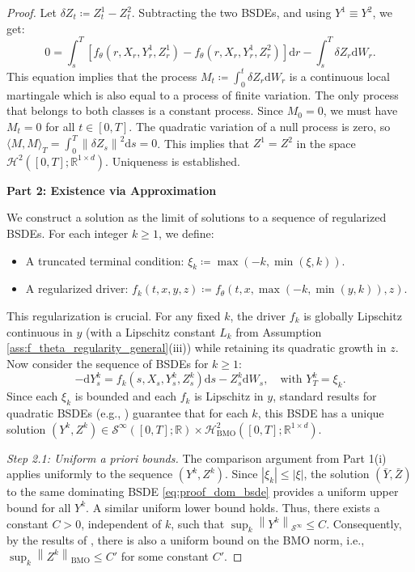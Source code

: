\documentclass[qian]{imsart}
\newcommand{\R}{\mathbb{R}}
\newcommand{\dd}{\mathrm{d}}
\newcommand{\norm}[1]{\left\lVert#1\right\rVert}
\newcommand{\abs}[1]{\left\lvert#1\right\rvert}
\theoremstyle{plain}
\theoremstyle{definition}
\begin{document}
\begin{proof}
Let $\delta Z_t \coloneqq Z^1_t - Z^2_t$. Subtracting the two BSDEs, and using $Y^1 \equiv Y^2$, we get:
\[ 0 = \int_s^T \left[ f_\theta(r, X_r, Y^1_r, Z^1_r) - f_\theta(r, X_r, Y^1_r, Z^2_r) \right] \dd r - \int_s^T \delta Z_r \dd W_r. \]
This equation implies that the process $M_t \coloneqq \int_0^t \delta Z_r \dd W_r$ is a continuous local martingale which is also equal to a process of finite variation. The only process that belongs to both classes is a constant process. Since $M_0 = 0$, we must have $M_t = 0$ for all $t \in [0,T]$. The quadratic variation of a null process is zero, so $\langle M, M \rangle_T = \int_0^T \norm{\delta Z_s}^2 \dd s = 0$. This implies that $Z^1 = Z^2$ in the space $\mathcal{H}^2([0,T]; \R^{1 \times d})$. Uniqueness is established.

\textbf{Part 2: Existence via Approximation}

We construct a solution as the limit of solutions to a sequence of regularized BSDEs. For each integer $k \ge 1$, we define:
\begin{itemize}
    \item A truncated terminal condition: $\xi_k \coloneqq \max(-k, \min(\xi, k))$.
    \item A regularized driver: $f_k(t,x,y,z) \coloneqq f_\theta(t,x, \max(-k, \min(y,k)), z)$.
\end{itemize}
This regularization is crucial. For any fixed $k$, the driver $f_k$ is globally Lipschitz continuous in $y$ (with a Lipschitz constant $L_k$ from Assumption \ref{ass:f_theta_regularity_general}(iii)) while retaining its quadratic growth in $z$. Now consider the sequence of BSDEs for $k \ge 1$:
\[ -\dd Y^k_s = f_k(s, X_s, Y^k_s, Z^k_s) \dd s - Z^k_s \dd W_s, \quad \text{with } Y^k_T = \xi_k. \]
Since each $\xi_k$ is bounded and each $f_k$ is Lipschitz in $y$, standard results for quadratic BSDEs (e.g., \cite{BriandEtAl2003}) guarantee that for each $k$, this BSDE has a unique solution $(Y^k, Z^k) \in \mathcal{S}^{\infty}([0,T]; \R) \times \mathcal{H}^2_{\mathrm{BMO}}([0,T]; \R^{1 \times d})$.

\emph{Step 2.1: Uniform a priori bounds.}
The comparison argument from Part 1(i) applies uniformly to the sequence $(Y^k, Z^k)$. Since $\abs{\xi_k} \le \abs{\xi}$, the solution $(\bar{Y}, \bar{Z})$ to the same dominating BSDE \eqref{eq:proof_dom_bsde} provides a uniform upper bound for all $Y^k$. A similar uniform lower bound holds. Thus, there exists a constant $C>0$, independent of $k$, such that $\sup_k \norm{Y^k}_{\mathcal{S}^\infty} \le C$. Consequently, by the results of \cite{Kobylanski2000}, there is also a uniform bound on the BMO norm, i.e., $\sup_k \norm{Z^k}_{\mathrm{BMO}} \le C'$ for some constant $C'$.


\end{proof}
\end{document}
